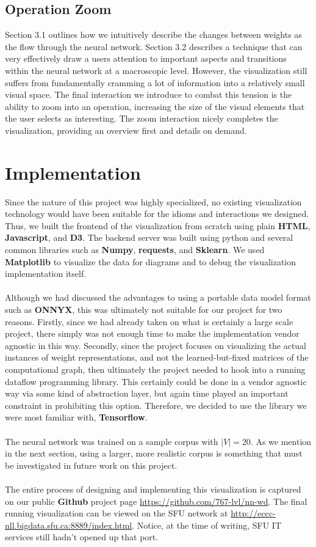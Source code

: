 \documentclass[journal]{vgtc}                %
\begin{document}
\subsection{Operation Zoom}
Section 3.1 outlines how we intuitively describe the changes between weights as the flow through the neural network.
Section 3.2 describes a technique that can very effectively draw a users attention to important aspects and transitions within the neural network at a macroscopic level.
However, the visualization still suffers from fundamentally cramming a lot of information into a relatively small visual space.
The final interaction we introduce to combat this tension is the ability to zoom into an operation, increasing the size of the visual elements that the user selects as interesting.
The zoom interaction nicely completes the visualization, providing an overview first and details on demand.

\section{Implementation}
Since the nature of this project was highly specialized, no existing visualization technology would have been suitable for the idioms and interactions we designed.
Thus, we built the frontend of the visualization from scratch using plain \textbf{HTML}, \textbf{Javascript}, and \textbf{D3}.
The backend server was built using python and several common libraries such as \textbf{Numpy}, \textbf{requests}, and \textbf{Sklearn}.
We used \textbf{Matplotlib} to visualize the data for diagrams and to debug the visualization implementation itself.
\\
\\
Although we had discussed the advantages to using a portable data model format such as \textbf{ONNYX}, this was ultimately not suitable for our project for two reasons.
Firstly, since we had already taken on what is certainly a large scale project, there simply was not enough time to make the implementation vendor agnostic in this way.
Secondly, since the project focuses on visualizing the actual instances of weight representations, and not the learned-but-fixed matrices of the computational graph, then ultimately the project needed to hook into a running dataflow programming library.
This certainly could be done in a vendor agnostic way via some kind of abstraction layer, but again time played an important constraint in prohibiting this option.
Therefore, we decided to use the library we were most familiar with, \textbf{Tensorflow}.
\\
\\
The neural network was trained on a sample corpus with $|V| = 20$.
As we mention in the next section, using a larger, more realistic corpus is something that must be investigated in future work on this project.
\\
\\
The entire process of designing and implementing this visualization is captured on our public \textbf{Github} project page \url{https://github.com/767-lvl/nn-wd}.
The final running visualization can be viewed on the SFU network at \url{http://eccc-nll.bigdata.sfu.ca:8889/index.html}.
Notice, at the time of writing, SFU IT services still hadn't opened up that port.
\end{document}
